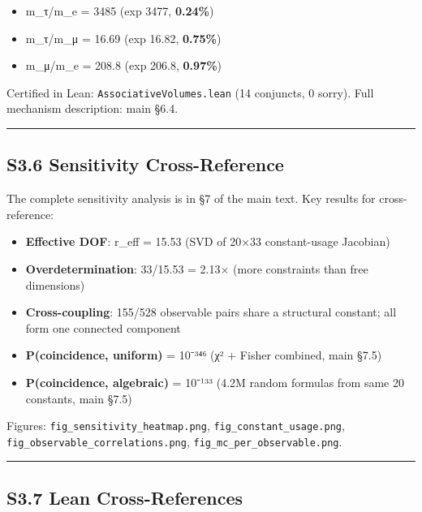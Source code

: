 \documentclass[11pt,a4paper]{article}
\begin{document}
{{{{{\begin{itemize}

\item
  m\_τ/m\_e = 3485 (exp 3477, \textbf{0.24\%})
\item
  m\_τ/m\_μ = 16.69 (exp 16.82, \textbf{0.75\%})
\item
  m\_μ/m\_e = 208.8 (exp 206.8, \textbf{0.97\%})
\end{itemize}

Certified in Lean: \texttt{AssociativeVolumes.lean} (14 conjuncts, 0 sorry). Full mechanism description: main §6.4.

\begin{center}\rule{0.5\linewidth}{0.5pt}\end{center}

\subsection{S3.6 Sensitivity Cross-Reference}\label{s3.6-sensitivity-cross-reference}

The complete sensitivity analysis is in §7 of the main text. Key results for cross-reference:

\begin{itemize}

\item
  \textbf{Effective DOF}: r\_eff = 15.53 (SVD of 20×33 constant-usage Jacobian)
\item
  \textbf{Overdetermination}: 33/15.53 = 2.13× (more constraints than free dimensions)
\item
  \textbf{Cross-coupling}: 155/528 observable pairs share a structural constant; all form one connected component
\item
  \textbf{P(coincidence, uniform)} = 10⁻³⁴⁶ (χ² + Fisher combined, main §7.5)
\item
  \textbf{P(coincidence, algebraic)} = 10⁻¹³³ (4.2M random formulas from same 20 constants, main §7.5)
\end{itemize}

Figures: \texttt{fig\_sensitivity\_heatmap.png}, \texttt{fig\_constant\_usage.png}, \texttt{fig\_observable\_correlations.png}, \texttt{fig\_mc\_per\_observable.png}.

\begin{center}\rule{0.5\linewidth}{0.5pt}\end{center}

\subsection{S3.7 Lean Cross-References}\label{s3.7-lean-cross-references}

}}}}}
\end{document}
